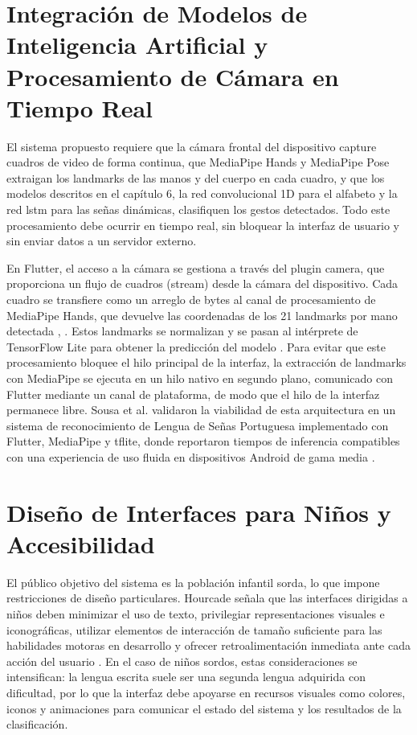 \section{Integración de Modelos de Inteligencia Artificial y Procesamiento de Cámara en Tiempo Real}

El sistema propuesto requiere que la cámara frontal del dispositivo capture cuadros de
video de forma continua, que MediaPipe Hands y MediaPipe Pose extraigan los landmarks de
las manos y del cuerpo en cada cuadro, y que los modelos descritos en el capítulo 6, la
red convolucional 1D para el alfabeto y la red \acrshort{lstm} para las señas dinámicas, clasifiquen
los gestos detectados. Todo este procesamiento debe ocurrir en tiempo real, sin bloquear
la interfaz de usuario y sin enviar datos a un servidor externo.

En Flutter, el acceso a la cámara se gestiona a través del plugin camera, que proporciona
un flujo de cuadros (stream) desde la cámara del dispositivo. Cada cuadro se transfiere
como un arreglo de bytes al canal de procesamiento de MediaPipe Hands, que devuelve las
coordenadas de los 21 landmarks por mano detectada \cite{google_mediapipe_2024},
\cite{zhang_mediapipe_2020}. Estos landmarks se normalizan y se pasan al intérprete de
TensorFlow Lite para obtener la predicción del modelo \cite{google_tflite_2024}. Para
evitar que este procesamiento bloquee el hilo principal de la interfaz, la extracción de
landmarks con MediaPipe se ejecuta en un hilo nativo en segundo plano, comunicado con
Flutter mediante un canal de plataforma, de modo que el hilo de la interfaz permanece libre. Sousa et al. validaron la viabilidad de esta arquitectura en un
sistema de reconocimiento de Lengua de Señas Portuguesa implementado con Flutter,
MediaPipe y \acrshort{tflite}, donde reportaron tiempos de inferencia compatibles con una
experiencia de uso fluida en dispositivos Android de gama media \cite{sousa_lgp_flutter_2025}.

\section{Diseño de Interfaces para Niños y Accesibilidad}

El público objetivo del sistema es la población infantil sorda, lo que impone restricciones
de diseño particulares. Hourcade señala que las interfaces dirigidas a niños deben
minimizar el uso de texto, privilegiar representaciones visuales e iconográficas, utilizar
elementos de interacción de tamaño suficiente para las habilidades motoras en desarrollo y
ofrecer retroalimentación inmediata ante cada acción del usuario \cite{hourcade_children_2008}.
En el caso de niños sordos, estas consideraciones se intensifican: la lengua escrita suele
ser una segunda lengua adquirida con dificultad, por lo que la interfaz debe apoyarse en
recursos visuales como colores, iconos y animaciones para comunicar el estado del sistema
y los resultados de la clasificación.

